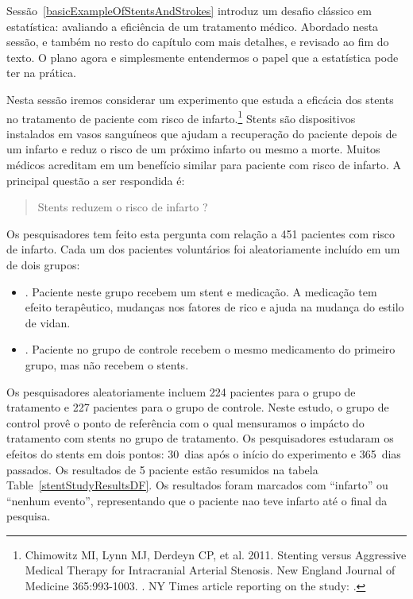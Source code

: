 
Sessão~\ref{basicExampleOfStentsAndStrokes} introduz um desafio clássico em estatística: avaliando a eficiência de um tratamento médico. Abordado nesta sessão, e também no resto do capítulo com mais detalhes, e revisado ao fim do texto. O plano agora e simplesmente entendermos o papel que a estatística pode ter na prática.

Nesta sessão iremos considerar um experimento que estuda a eficácia dos stents no tratamento de paciente com risco de infarto.\footnote{Chimowitz MI, Lynn MJ, Derdeyn CP, et al. 2011. Stenting versus Aggressive Medical Therapy for Intracranial Arterial Stenosis. New England Journal of Medicine 365:993-1003. . NY Times article reporting on the study: .} Stents são dispositivos instalados em vasos sanguíneos que ajudam a recuperação do paciente depois de um infarto e reduz o risco de um próximo infarto ou mesmo a morte. Muitos médicos acreditam em um benefício similar para paciente com risco de infarto. A principal questão a ser respondida é:
\begin{quote}
Stents reduzem o risco de infarto ?
\end{quote}

Os pesquisadores tem feito esta pergunta com relação a 451 pacientes com risco de infarto. Cada um dos pacientes voluntários foi aleatoriamente incluído em um de dois grupos:
\begin{itemize}
\item[]. Paciente neste grupo recebem um stent e medicação. A medicação tem efeito terapêutico, mudanças nos fatores de rico e ajuda na mudança do estilo de vidan.
\item[]. Paciente no grupo de controle recebem o mesmo medicamento do primeiro grupo, mas não recebem o stents.
\end{itemize}
Os pesquisadores aleatoriamente incluem 224 pacientes para o grupo de tratamento e 227 pacientes para o grupo de controle. Neste estudo, o grupo de control provê o ponto de referência com o qual mensuramos o impácto do tratamento com stents no grupo de tratamento.
Os pesquisadores estudaram os efeitos do stents em dois pontos: 30~dias após o início do experimento e 365~dias passados. Os resultados de 5 paciente estão resumidos na tabela Table~\ref{stentStudyResultsDF}. Os resultados foram marcados com ``infarto'' ou ``nenhum evento'', representando que o paciente nao teve infarto até o final da pesquisa.

